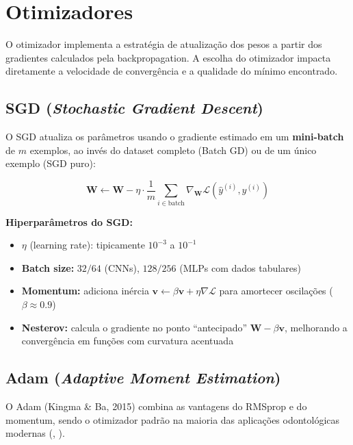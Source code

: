 \section{Otimizadores}
\label{sec:otimizadores}

O otimizador implementa a estratégia de atualização dos pesos a partir dos
gradientes calculados pela backpropagation. A escolha do otimizador impacta
diretamente a velocidade de convergência e a qualidade do mínimo encontrado.

\subsection{SGD (\textit{Stochastic Gradient Descent})}

O SGD atualiza os parâmetros usando o gradiente estimado em um \textbf{mini-batch}
de $m$ exemplos, ao invés do dataset completo (Batch GD) ou de um único exemplo
(SGD puro):

\begin{equation}
  \mathbf{W} \leftarrow \mathbf{W} - \eta \cdot \frac{1}{m} \sum_{i \in \text{batch}}
    \nabla_{\mathbf{W}} \mathcal{L}(\hat{y}^{(i)}, y^{(i)})
  \label{eq:sgd}
\end{equation}

\textbf{Hiperparâmetros do SGD:}
\begin{itemize}
  \item $\eta$ (learning rate): tipicamente $10^{-3}$ a $10^{-1}$
  \item \textbf{Batch size:} $32/64$ (CNNs), $128/256$ (MLPs com dados tabulares)
  \item \textbf{Momentum:} adiciona inércia $\mathbf{v} \leftarrow \beta\mathbf{v} + \eta\nabla\mathcal{L}$
        para amortecer oscilações ($\beta \approx 0.9$)
  \item \textbf{Nesterov:} calcula o gradiente no ponto ``antecipado''
        $\mathbf{W} - \beta\mathbf{v}$, melhorando a convergência em funções
        com curvatura acentuada
\end{itemize}

\subsection{Adam (\textit{Adaptive Moment Estimation})}

O Adam (Kingma \& Ba, 2015) combina as vantagens do RMSprop e do momentum,
sendo o otimizador padrão na maioria das aplicações odontológicas modernas
(, ).

